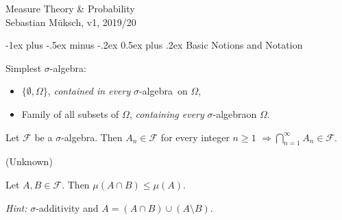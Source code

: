 \documentclass[10pt,landscape]{article}
\makeatletter
\renewcommand{\leq}{\leqslant}
\renewcommand{\geq}{\geqslant}
\newcommand{\Hint}{\textit{Hint: }}
\newcommand{\SigmaAlgebra}{$\sigma$-algebra}
\newcommand{\CalF}{\mathcal{F}}
\renewcommand{\section}{\@startsection{section}{1}{0mm}%
                                {-1ex plus -.5ex minus -.2ex}%
                                {0.5ex plus .2ex}%
                                {\normalfont\large\bfseries}}
\makeatother
\begin{document}
\raggedright
\footnotesize
\begin{multicols}{3}


\setlength{\premulticols}{1pt}
\setlength{\postmulticols}{1pt}
\setlength{\multicolsep}{1pt}
\setlength{\columnsep}{2pt}
\setlength{\columnseprule}{0.4pt} %

\begin{center}
     \Large{Measure Theory \& Probability} \\
     \footnotesize{Sebastian Müksch, v1, 2019/20}
\end{center}


\section{Basic Notions and Notation}

\begin{example}{1.1}{}

    Simplest \SigmaAlgebra:

        \begin{itemize}
            \setlength{\parskip}{0em}
            \item $\{\emptyset, \Omega\}$, \emph{contained in every} \SigmaAlgebra \ on $\Omega$,
            \item Family of all subsets of $\Omega$, \emph{containing every} \SigmaAlgebra on $\Omega$.
        \end{itemize}

\end{example}

\begin{exercise}{1.1}{}

    Let $\CalF$ be a \SigmaAlgebra. Then $A_n \in \CalF$ for every integer $n \geq 1$ $\Rightarrow \bigcap_{n=1}^{\infty} A_n \in \CalF$.

\end{exercise}

\begin{proposition}{(Unknown)}{}

    Let $A, B \in \CalF$. Then $\mu(A \cap B) \leq \mu(A)$.

    \Hint $\sigma$-additivity and $A = (A \cap B) \cup (A \setminus B)$.

\end{proposition}


\end{multicols}
\end{document}
